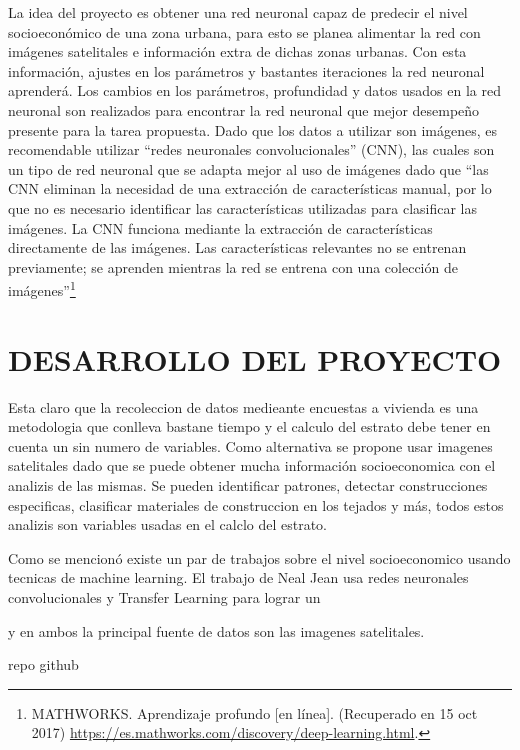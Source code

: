   La idea del proyecto es obtener una red neuronal capaz de predecir el nivel socioeconómico de una zona urbana, para esto se planea alimentar la red con imágenes satelitales e información extra de dichas zonas urbanas. Con esta información, ajustes en los parámetros y bastantes iteraciones la red neuronal aprenderá. Los cambios en los parámetros, profundidad y datos usados en la red neuronal son realizados para encontrar la red neuronal que mejor desempeño presente para la tarea propuesta.
  Dado que los datos a utilizar son imágenes, es recomendable utilizar “redes neuronales convolucionales” (CNN), las cuales son un tipo de red neuronal que se adapta mejor al uso de imágenes dado que “las CNN eliminan la necesidad de una extracción de características manual, por lo que no es necesario identificar las características utilizadas para clasificar las imágenes. La CNN funciona mediante la extracción de características directamente de las imágenes. Las características relevantes no se entrenan previamente; se aprenden mientras la red se entrena con una colección de imágenes”\footnote[12]{MATHWORKS. Aprendizaje profundo [en línea]. (Recuperado en 15 oct 2017) \url{https://es.mathworks.com/discovery/deep-learning.html}.}
  
 \newpage\chapter{DESARROLLO DEL PROYECTO}  
  Esta claro que la recoleccion de datos medieante encuestas a vivienda es una metodologia que conlleva bastane tiempo y el calculo del estrato debe tener en cuenta un sin numero de variables. Como alternativa se propone usar imagenes satelitales dado que se puede obtener mucha información socioeconomica con el analizis de las mismas. Se pueden identificar patrones, detectar construcciones especificas, clasificar materiales de construccion en los tejados y más, todos estos analizis son variables usadas en el calclo del estrato.
  
 Como se mencionó existe un par de trabajos sobre el nivel socioeconomico usando tecnicas de machine learning. El trabajo de Neal Jean usa redes neuronales convolucionales y Transfer Learning para lograr un  
 
 y en ambos la principal fuente de datos son las imagenes satelitales.
 
 repo github
 

